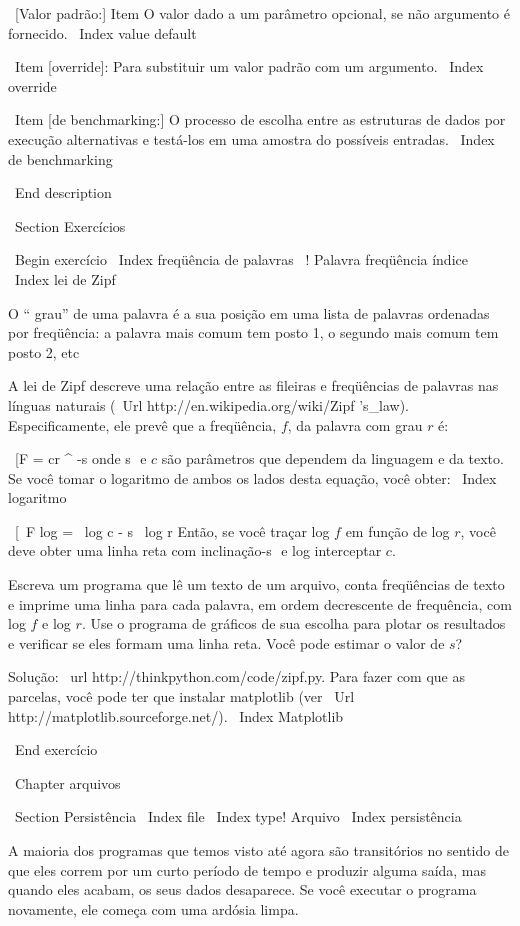 \documentclass[10pt]{book}
\begin{document}
\begin {itemize}
{{{{{{{{{{\ [Valor padrão:] Item O valor dado a um parâmetro opcional, se não
argumento é fornecido.
\ Index {value default}

\ Item [override]: Para substituir um valor padrão com um argumento.
\ Index {override}

\ Item [de benchmarking:] O processo de escolha entre as estruturas de dados
por execução alternativas e testá-los em uma amostra do
possíveis entradas.  
\ Index {} de benchmarking

\ End {description}


\ Section {Exercícios}

\ Begin {} exercício
\ Index {freqüência de palavras}
\ {! Palavra freqüência} índice
\ Index {lei de Zipf}

O `` grau'' de uma palavra é a sua posição em uma lista de palavras
ordenadas por freqüência: a palavra mais comum tem posto 1, o
segundo mais comum tem posto 2, etc

A lei de Zipf descreve uma relação entre as fileiras e freqüências
de palavras nas línguas naturais
(\ Url {http://en.wikipedia.org/wiki/Zipf 's_law}). Especificamente, ele
prevê que a freqüência, $ f $, da palavra com grau $ r $ é:

\ [F = cr ^ {-s} \]
%
onde s $ $ e $ c $ são parâmetros que dependem da linguagem e da
texto. Se você tomar o logaritmo de ambos os lados desta equação, você
obter:
\ Index {logaritmo}

\ [\ F log = \ log c - s \ log r \]
%
Então, se você traçar log $ f $ em função de log $ r $, você deve obter
uma linha reta com inclinação-s $ $ e log interceptar $ c $.

Escreva um programa que lê um texto de um arquivo, conta
freqüências de texto e imprime uma linha
para cada palavra, em ordem decrescente de frequência, com
log $ f $ e log $ r $. Use o programa de gráficos de sua
escolha para plotar os resultados e verificar se eles formam
uma linha reta. Você pode estimar o valor de $ s $?

Solução: \ url {http://thinkpython.com/code/zipf.py}. Para fazer com que as parcelas, você
pode ter que instalar matplotlib (ver
\ Url {http://matplotlib.sourceforge.net/}).
\ Index {} Matplotlib

\ End {} exercício


\ Chapter {arquivos}


\ Section {} Persistência
\ Index {file}
\ Index {type! Arquivo}
\ Index {persistência}

A maioria dos programas que temos visto até agora são transitórios no
sentido de que eles correm por um curto período de tempo e produzir alguma saída,
mas quando eles acabam, os seus dados desaparece. Se você executar o programa
novamente, ele começa com uma ardósia limpa.

}}}}}}}}}}
\end{itemize}
\end{document}

